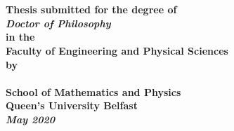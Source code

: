 


\thispagestyle{empty}

\begingroup

 \par
\centering
{}
~
\\[1em]
\sffamily\bfseries\fontsize{26}{31.2}\selectfont
\DocumentTitle
\\[0.4in]
\normalfont\large
Thesis submitted for the degree of
\\[0.25em]
{\itshape Doctor of Philosophy}
\\[0.25em]
in the
\\[0.25em]
Faculty of Engineering and Physical Sciences
\\[0.25em]
by
\\[0.25em]
\sffamily\bfseries\Large
\AuthorName
\\[0.4in]
\normalfont\normalsize
\vfill
School of Mathematics and Physics
\\[0.5em]
Queen's University Belfast
\\[0.5em]
\emph{\textbf{May 2020}}
\par
\endgroup

\clearpage

